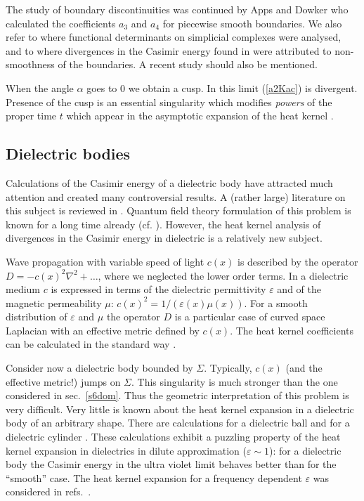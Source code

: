 The study of boundary discontinuities was continued by Apps and
Dowker who calculated the coefficients $a_3$ \cite{Dowker:1995sp}
and $a_4$ \cite{Apps:1998zr} for piecewise smooth boundaries.
We also refer to \cite{Aurell:1994} where functional determinants
on simplicial complexes were analysed, and to
\cite{Dowker:2000fs} where divergences in the Casimir energy
found in \cite{Nesterenko:2000eb} were attributed to non-smoothness
of the boundaries. A recent study \cite{Nesterenko:2002ng}
should also be mentioned.

When the angle $\alpha$ goes to $0$ we obtain a cusp. In this limit
(\ref{a2Kac}) is divergent. Presence of the cusp is an essential
singularity which modifies {\it powers} of the proper
time $t$ which appear in the asymptotic expansion of the heat
kernel \cite{Stewartson:1971}.
\subsection{Dielectric bodies}\label{s6diel}
Calculations of the Casimir energy of a dielectric body 
have attracted much attention and created many controversial
results. A (rather large) literature on this subject is reviewed
in \cite{Bordag:2001qi,Milton:2001yy}. Quantum field theory formulation
of this problem is known for a long time already (cf. 
\cite{Schwinger:1979pa,Milton:1980yx,Candelas:1982qw}). However, the
heat kernel analysis of divergences in the Casimir energy in
dielectric is a relatively new subject. 

Wave propagation with variable speed of light $c(x)$
is described by the operator $D=-c(x)^2 \nabla^2 +\dots$,
where we neglected the lower order terms. In a dielectric medium
$c$ is expressed in terms of the dielectric permittivity $\varepsilon$
and of the magnetic permeability $\mu$:
$c(x)^2=1/(\varepsilon (x)\mu (x))$. 
For a smooth distribution of $\varepsilon$ and $\mu$
the operator $D$
is a particular case of curved space Laplacian with
an effective metric defined by $c(x)$. The heat kernel
coefficients can be calculated in the standard way \cite{Bordag:1998fh}.

Consider now a dielectric body bounded by $\Sigma$. Typically, 
$c(x)$ (and the effective metric!) jumps on $\Sigma$.
This singularity is much stronger than the one considered
in sec.\ \ref{s6dom}. Thus the geometric interpretation of this
problem is very difficult. Very little is known about the heat kernel
expansion in a dielectric body of an arbitrary shape.
There are calculations for a dielectric ball 
\cite{Bordag:1998vs} and for a dielectric cylinder \cite{Bordag:2001zj}.
These calculations exhibit a puzzling property of the heat kernel
expansion in dielectrics in dilute approximation ($\varepsilon \sim 1$):
for a dielectric body the Casimir energy
in the ultra violet limit behaves 
better than for the ``smooth'' case.
The heat kernel expansion for a frequency dependent $\varepsilon$
was considered in refs.\ \cite{Falomir:2001uv,Bordag:2001fq}.
